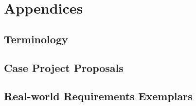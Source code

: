 
\part*{Appendices}

\appendix

\chapter{Terminology}

\chapter{Case Project Proposals}

\chapter{Real-world Requirements Exemplars}
